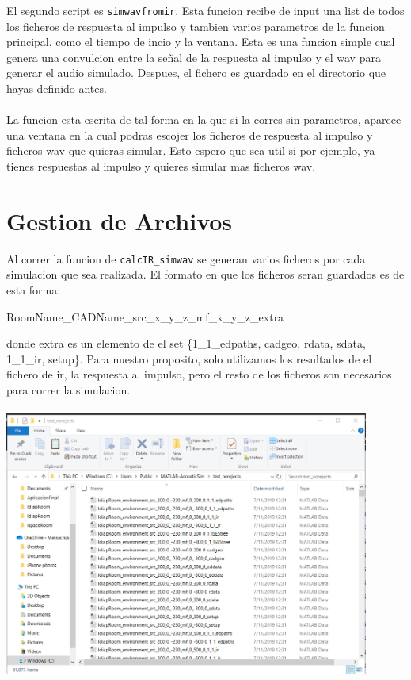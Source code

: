 \documentclass{article}
\begin{document}
El segundo script es \texttt{simwavfromir}. Esta funcion recibe de input una list de todos los ficheros de respuesta al impulso y tambien varios parametros de la funcion principal, como el tiempo de incio y la ventana. Esta es una funcion simple cual genera una convulcion entre la señal de la respuesta al impulso y el wav para generar el audio simulado. Despues, el fichero es guardado en el directorio que hayas definido antes. \\\\
La funcion esta escrita de tal forma en la que si la corres sin parametros, aparece una ventana en la cual podras escojer los ficheros de respuesta al impulso y ficheros wav que quieras simular. Esto espero que sea util si por ejemplo, ya tienes respuestas al impulso y quieres simular mas ficheros wav. 

\section{Gestion de Archivos}
Al correr la funcion de \texttt{calcIR\_simwav} se generan varios ficheros por cada simulacion que sea realizada. El formato en que los ficheros seran guardados es de esta forma:
\begin{center}
    RoomName\_CADName\_src\_x\_y\_z\_mf\_x\_y\_z\_extra
\end{center}
donde extra es un elemento de el set \{1\_1\_edpaths, cadgeo, rdata, sdata, 1\_1\_ir, setup\}. Para nuestro proposito, solo utilizamos los resultados de el fichero de ir, la respuesta al impulso, pero el resto de los ficheros son necesarios para correr la simulacion.\\\\
\includegraphics[width=0.9\textwidth]{filemanage.png}
\end{document}

